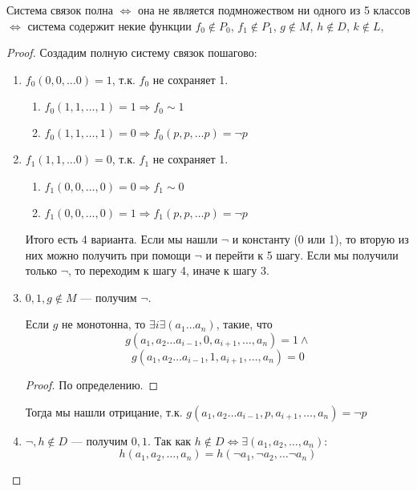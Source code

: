 \begin{theorem}
    Система связок полна $\Leftrightarrow$ она не является подмножеством ни одного из 5 классов $\Leftrightarrow$ система содержит некие функции $f_0 \not\in P_0$, $f_1 \not\in P_1$, $g \not\in M$, $h \not\in D$, $k \not\in L$, 
\end{theorem}
\begin{proof}
    Создадим полную систему связок пошагово:
    \begin{enumerate}
        \item $f_0(0, 0, \dots 0) = 1$, т.к. $f_0$ не сохраняет 1.
        \begin{enumerate}
            \item $f_0(1, 1, \dots, 1) = 1 \Rightarrow f_0 \sim 1$
            \item $f_0(1, 1, \dots, 1) = 0 \Rightarrow f_0(p, p, \dots p) = \neg p$
        \end{enumerate}
        \item $f_1(1, 1, \dots 0) = 0$, т.к. $f_1$ не сохраняет 1.
        \begin{enumerate}
            \item $f_1(0, 0, \dots, 0) = 0 \Rightarrow f_1 \sim 0$
            \item $f_1(0, 0, \dots, 0) = 1 \Rightarrow f_1(p, p, \dots p) = \neg p$
        \end{enumerate}
        Итого есть 4 варианта. Если мы нашли $\neg$ и константу (0 или 1), то вторую из них можно получить при помощи $\neg$ и перейти к 5 шагу. Если мы получили только $\neg$, то переходим к шагу 4, иначе к шагу 3.
        \item $0, 1, g \not\in M$ --- получим $\neg$.
        \begin{lemma}
            Если $g$ не монотонна, то $\exists i \exists (a_1 \dots a_n)$, такие, что 
            $$g(a_1, a_2 \dots a_{i-1}, 0, a_{i+1}, \dots, a_n) = 1 \wedge$$
            $$g(a_1, a_2 \dots a_{i-1}, 1, a_{i+1}, \dots, a_n) = 0$$
        \end{lemma}
        \begin{proof}
            По определению.
        \end{proof}
        Тогда мы нашли отрицание, т.к. $g(a_1, a_2 \dots a_{i-1}, p, a_{i+1}, \dots, a_n) = \neg p$
        \item $\neg, h \not\in D$ --- получим $0, 1$.
        Так как $h \not\in D \Leftrightarrow \exists(a_1, a_2, \dots, a_n):$
        $$h(a_1, a_2, \dots, a_n) = h(\neg a_1, \neg a_2, \dots \neg a_n)$$

\end{enumerate}
\end{proof}
